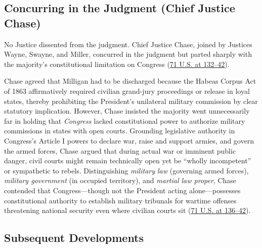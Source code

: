 \documentclass[12pt]{article}
\begin{document}
\subsection{Concurring in the Judgment (Chief Justice Chase)}

No Justice dissented from the judgment. Chief Justice Chase, joined by Justices Wayne, Swayne, and Miller, concurred in the judgment but parted sharply with the majority's constitutional limitation on Congress (\href{https://supreme.justia.com/cases/federal/us/71/2/}{71 U.S. at 132--42}).

Chase agreed that Milligan had to be discharged because the Habeas Corpus Act of 1863 affirmatively required civilian grand-jury proceedings or release in loyal states, thereby prohibiting the President's unilateral military commission by clear statutory implication. However, Chase insisted the majority went unnecessarily far in holding that \textit{Congress} lacked constitutional power to authorize military commissions in states with open courts. Grounding legislative authority in Congress's Article I powers to declare war, raise and support armies, and govern the armed forces, Chase argued that during actual war or imminent public danger, civil courts might remain technically open yet be ``wholly incompetent'' or sympathetic to rebels. Distinguishing \textit{military law} (governing armed forces), \textit{military government} (in occupied territory), and \textit{martial law proper}, Chase contended that Congress---though not the President acting alone---possesses constitutional authority to establish military tribunals for wartime offenses threatening national security even where civilian courts sit (\href{https://supreme.justia.com/cases/federal/us/71/2/}{71 U.S. at 136--42}).

\subsection{Subsequent Developments}
\end{document}
